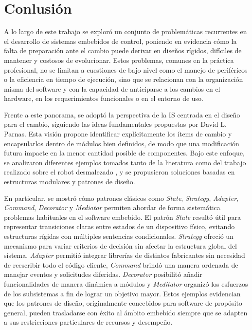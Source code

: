 \chapter{Conlusión}
\label{conclusion}

A lo largo de este trabajo se exploró un conjunto de problemáticas recurrentes en el desarrollo de sistemas embebidos de control, poniendo en evidencia cómo la falta de preparación ante el cambio puede derivar en diseños rígidos, difíciles de mantener y costosos de evolucionar. Estos problemas, comunes en la práctica profesional, no se limitan a cuestiones de bajo nivel como el manejo de periféricos o la eficiencia en tiempo de ejecución, sino que se relacionan con la organización misma del software y con la capacidad de anticiparse a los cambios en el hardware, en los requerimientos funcionales o en el entorno de uso.

Frente a este panorama, se adoptó la perspectiva de la \gls{IS} centrada en el diseño para el cambio, siguiendo las ideas fundamentales propuestas por David L. Parnas. Esta visión propone identificar explícitamente los ítems de cambio y encapsularlos dentro de módulos bien definidos, de modo que una modificación futura impacte en la menor cantidad posible de componentes. Bajo este enfoque, se analizaron diferentes ejemplos tomados tanto de la literatura \citep{douglass} como del trabajo realizado sobre el robot desmalezado \cite{paperPomponio}, y se propusieron soluciones basadas en estructuras modulares y patrones de diseño.

En particular, se mostró cómo patrones clásicos como \textit{State}, \textit{Strategy}, \textit{Adapter}, \textit{Command}, \textit{Decorator} y \textit{Mediator} permiten abordar de forma sistemática problemas habituales en el software embebido. El patrón \textit{State} resultó útil para representar transiciones claras entre estados de un dispositivo físico, evitando estructuras rígidas con múltiples sentencias condicionales. \textit{Strategy} ofreció un mecanismo para variar criterios de decisión sin afectar la estructura global del sistema. \textit{Adapter} permitió integrar librerías de distintos fabricantes sin necesidad de reescribir todo el código cliente, \textit{Command} brindó una manera ordenada de manejar eventos y solicitudes diferidas. \textit{Decorator} posibilitó añadir funcionalidades de manera dinámica a módulos y \textit{Meditator} organizó los esfuerzos de los subsistemas a fin de lograr un objetivo mayor. Estos ejemplos evidencian que los patrones de diseño, originalmente concebidos para software de propósito general, pueden trasladarse con éxito al ámbito embebido siempre que se adapten a sus restricciones particulares de recursos y desempeño.

